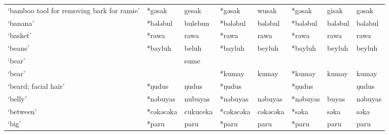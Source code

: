 \begin{landscape}
\begin{longtable}[c]{@{}p{3cm}<{\raggedright}p{2.75cm}<{\raggedright}p{2.75cm}<{\raggedright}p{2.75cm}<{\raggedright}p{2.75cm}<{\raggedright}p{2.75cm}<{\raggedright}p{2.75cm}<{\raggedright}p{2.75cm}<{\raggedright}@{}}
`bamboo tool for removing bark for ramie'            & *gəsak             & gesak                          & *gəsak             & wusak                      & *gəsak           & gisak                    & gəsak                             \\
`banana'                                             & *bələbul           & bulebun                        & *bələbul           & bələbul                    & *bələbul         & bələbul                  & bələbul                           \\
`basket'                                             & *rawa              & rawa                           & *rawa              & rawa                       & *rawa            & rawa                     & rawa                              \\
`beans'                                              & *bayluh            & beluh                          & *bayluh            & beyluh                     & *bayluh          & beyluh                   & beyluh                            \\
`bear'                                               &                    & sume                           &                    &                            &                  &                          &                                   \\
`bear'                                               &                    &                                & *kumay             & kumay                      & *kumay           & kumay                    & kumay                             \\
`beard; facial hair'                                 & *ŋudus             & ŋudus                          & *ŋudus             &                            & *ŋudus           &                          & ŋudus                             \\
`belly'                                              & *nəbuyas           & nubuyas                        & *nəbuyas           & nəbuyas                    & *nəbuyas         & buyas                    & nəbuyas                           \\
`between'                                            & *cəkəcəka          & cukuceka                       & *cəkəcəka          & cəkəcəka                   & *səka            & səka                     & səka                              \\
`big'                                                & *paru              & paru                           & *paru              & paru                       & *paru            & paru                     & paru                              \\

\end{longtable}
\end{landscape}
